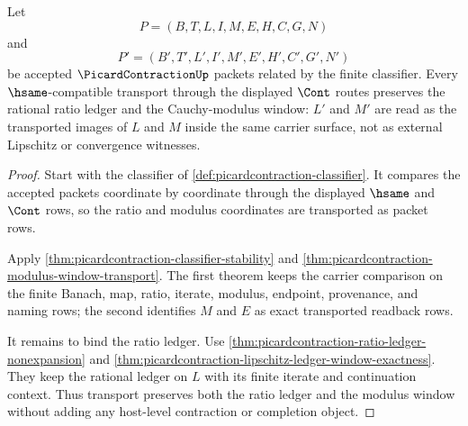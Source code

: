 \begin{theorem}
\label{thm:picardcontraction-ratio-window-carrier-transport}
Let
$$
P=(B,T,L,I,M,E,H,C,G,N)
$$
and
$$
P'=(B',T',L',I',M',E',H',C',G',N')
$$
be accepted $\PicardContractionUp$ packets related by the finite classifier.
Every $\hsame$-compatible transport through the displayed $\Cont$ routes
preserves the rational ratio ledger and the Cauchy-modulus window: $L'$ and
$M'$ are read as the transported images of $L$ and $M$ inside the same carrier
surface, not as external Lipschitz or convergence witnesses.
\end{theorem}
\begin{proof}
Start with the classifier of \autoref{def:picardcontraction-classifier}. It
compares the accepted packets coordinate by coordinate through the displayed
$\hsame$ and $\Cont$ rows, so the ratio and modulus coordinates are transported
as packet rows.

Apply \autoref{thm:picardcontraction-classifier-stability} and
\autoref{thm:picardcontraction-modulus-window-transport}. The first theorem
keeps the carrier comparison on the finite Banach, map, ratio, iterate,
modulus, endpoint, provenance, and naming rows; the second identifies $M$ and
$E$ as exact transported readback rows.

It remains to bind the ratio ledger. Use
\autoref{thm:picardcontraction-ratio-ledger-nonexpansion} and
\autoref{thm:picardcontraction-lipschitz-ledger-window-exactness}. They keep
the rational ledger on $L$ with its finite iterate and continuation context.
Thus transport preserves both the ratio ledger and the modulus window without
adding any host-level contraction or completion object.
\end{proof}

